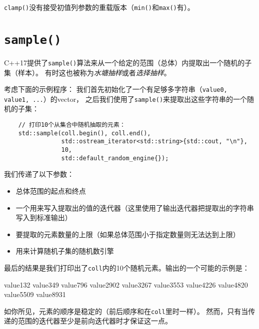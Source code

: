 \texttt{clamp()}没有接受初值列参数的重载版本（\texttt{min()}和\texttt{max()}有）。


\section{\texttt{sample()}}\label{ch25.4}
C++17提供了\texttt{sample()}算法来从一个给定的范围（总体）内提取出一个随机的子集（样本）。
有时这也被称为\emph{水塘抽样}或者\emph{选择抽样}。

考虑下面的示例程序：
我们首先初始化了一个有足够多字符串（\texttt{value0, value1, ...}）的vector，
之后我们使用了\texttt{sample()}来提取出这些字符串的一个随机的子集：
\begin{lstlisting}
    // 打印10个从集合中随机抽取的元素：
    std::sample(coll.begin(), coll.end(),
                std::ostream_iterator<std::string>{std::cout, "\n"},
                10,
                std::default_random_engine{});
\end{lstlisting}
我们传递了以下参数：
\begin{itemize}
    \item 总体范围的起点和终点
    \item 一个用来写入提取出的值的迭代器（这里使用了输出迭代器把提取出的字符串写入到标准输出）
    \item 要提取的元素数量的上限（如果总体范围小于指定数量则无法达到上限）
    \item 用来计算随机子集的随机数引擎
\end{itemize}
最后的结果是我们打印出了\texttt{coll}内的10个随机元素。输出的一个可能的示例是：
\begin{blacklisting}
    value132
    value349
    value796
    value2902
    value3267
    value3553
    value4226
    value4820
    value5509
    value8931
\end{blacklisting}
如你所见，元素的顺序是稳定的（前后顺序和在\texttt{coll}里时一样）。
然而，只有当传递的范围的迭代器至少是前向迭代器时才保证这一点。

